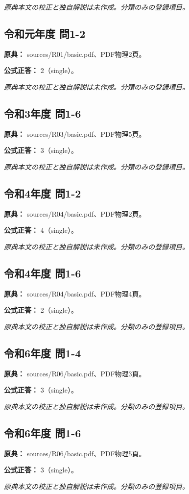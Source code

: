 \par\textit{原典本文の校正と独自解説は未作成。分類のみの登録項目。}

\subsection{令和元年度 問1-2}
\label{q:r01-reg-basic-1-2}

\noindent\textbf{原典：} sources/R01/basic.pdf、PDF物理2頁。

\textbf{公式正答：} 2（single）。

\par\textit{原典本文の校正と独自解説は未作成。分類のみの登録項目。}

\subsection{令和3年度 問1-6}
\label{q:r03-reg-basic-1-6}

\noindent\textbf{原典：} sources/R03/basic.pdf、PDF物理5頁。

\textbf{公式正答：} 3（single）。

\par\textit{原典本文の校正と独自解説は未作成。分類のみの登録項目。}

\subsection{令和4年度 問1-2}
\label{q:r04-reg-basic-1-2}

\noindent\textbf{原典：} sources/R04/basic.pdf、PDF物理2頁。

\textbf{公式正答：} 4（single）。

\par\textit{原典本文の校正と独自解説は未作成。分類のみの登録項目。}

\subsection{令和4年度 問1-6}
\label{q:r04-reg-basic-1-6}

\noindent\textbf{原典：} sources/R04/basic.pdf、PDF物理4頁。

\textbf{公式正答：} 2（single）。

\par\textit{原典本文の校正と独自解説は未作成。分類のみの登録項目。}

\subsection{令和6年度 問1-4}
\label{q:r06-reg-basic-1-4}

\noindent\textbf{原典：} sources/R06/basic.pdf、PDF物理3頁。

\textbf{公式正答：} 3（single）。

\par\textit{原典本文の校正と独自解説は未作成。分類のみの登録項目。}

\subsection{令和6年度 問1-6}
\label{q:r06-reg-basic-1-6}

\noindent\textbf{原典：} sources/R06/basic.pdf、PDF物理5頁。

\textbf{公式正答：} 3（single）。

\par\textit{原典本文の校正と独自解説は未作成。分類のみの登録項目。}
